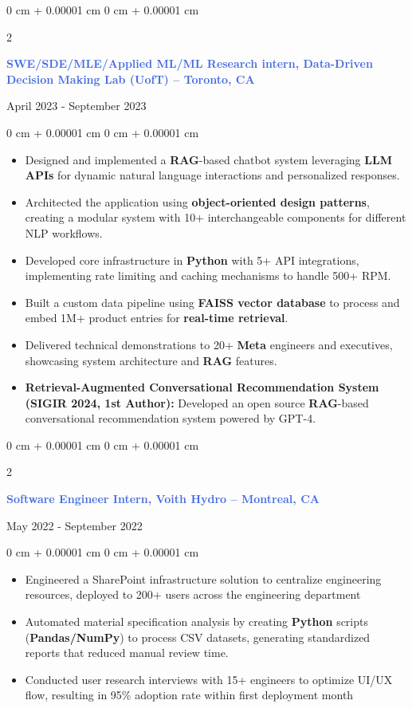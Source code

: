 \documentclass[10pt, letterpaper]{article}
\newenvironment{highlights}{
    \begin{itemize}[
        topsep=0.10 cm,
        parsep=0.10 cm,
        partopsep=0pt,
        itemsep=0pt,
        leftmargin=0 cm + 10pt
    ]
}{
    \end{itemize}
}
\newenvironment{onecolentry}{
    \begin{adjustwidth}{
        0 cm + 0.00001 cm
    }{
        0 cm + 0.00001 cm
    }
}{
    \end{adjustwidth}
}
\newenvironment{twocolentry}[2][]{
    \onecolentry
    \def\secondColumn{#2}
    \setcolumnwidth{\fill, 4.5 cm}
    \begin{paracol}{2}
}{
    \switchcolumn \raggedleft \secondColumn
    \end{paracol}
    \endonecolentry
}
\begin{document}
\vspace{0.25 cm}
\begin{twocolentry}{April 2023 - September 2023}
 \textcolor{royalblue}{\textbf{SWE/SDE/MLE/Applied ML/ML Research intern, Data-Driven Decision Making Lab (UofT) -- Toronto, CA}}
\end{twocolentry}
\begin{onecolentry}
    \begin{highlights}
        \item Designed and implemented a \textbf{RAG}-based chatbot system leveraging \textbf{LLM APIs} for dynamic natural language interactions and personalized responses.
        \item Architected the application using \textbf{object-oriented design patterns}, creating a modular system with 10+ interchangeable components for different NLP workflows.
        \item Developed core infrastructure in \textbf{Python} with 5+ API integrations, implementing rate limiting and caching mechanisms to handle 500+ RPM.
        \item Built a custom data pipeline using \textbf{FAISS vector database} to process and embed 1M+ product entries for \textbf{real-time retrieval}.
        \item Delivered technical demonstrations to 20+ \textbf{Meta} engineers and executives, showcasing system architecture and \textbf{RAG} features.
        \item \textbf{Retrieval-Augmented Conversational Recommendation System (SIGIR 2024, 1st Author):} Developed an open source \textbf{RAG}-based conversational recommendation system powered by GPT-4.
    \end{highlights}
\end{onecolentry}

\vspace{0.25 cm}
\begin{twocolentry}{May 2022 - September 2022}
    \textcolor{royalblue}{\textbf{Software Engineer Intern, Voith Hydro -- Montreal, CA}}
\end{twocolentry}
\begin{onecolentry}
    \begin{highlights}
        \item Engineered a SharePoint infrastructure solution to centralize engineering resources, deployed to 200+ users across the engineering department
        \item Automated material specification analysis by creating \textbf{Python} scripts (\textbf{Pandas/NumPy}) to process CSV datasets, generating standardized reports that reduced manual review time.
        \item Conducted user research interviews with 15+ engineers to optimize UI/UX flow, resulting in 95\% adoption rate within first deployment month
    \end{highlights}
\end{onecolentry}
\end{document}
